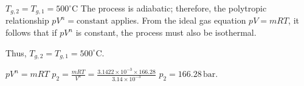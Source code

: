 \( T_{g,2} = T_{g,1} = 500^\circ \text{C} \)  
The process is adiabatic; therefore, the polytropic relationship \( pV^n = \text{constant} \) applies.  
From the ideal gas equation \( pV = mRT \), it follows that if \( pV^n \) is constant, the process must also be isothermal.  

Thus, \( T_{g,2} = T_{g,1} = 500^\circ \text{C} \).  

\( pV^n = mRT \)  
\( p_2 = \frac{mRT}{V^n} = \frac{3.1422 \times 10^{-3} \times 166.28}{3.14 \times 10^{-3}} \)  
\( p_2 = 166.28 \, \text{bar} \).